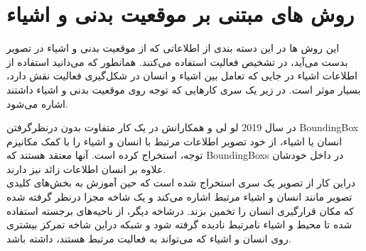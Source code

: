 \section{روش های مبتنی بر موقعیت بدنی و اشیاء}

این روش ها در این دسته بندی از اطلاعاتی که از موقعیت بدنی و اشیاء در تصویر بدست می‌آید، در تشخیص فعالیت استفاده می‌کنند. همانطور که می‌دانید استفاده از اطلاعات اشیاء در جایی که تعامل بین اشیاء و انسان در شکل‌گیری فعالیت نقش دارد، بسیار موثر است. در زیر یک سری کارهایی که توجه روی موقعیت بدنی و اشیاء داشتند اشاره می‌شود.

در سال 2019 لو لی و همکارانش %
\cite{Loss_guided_actv_attention}
در یک کار متفاوت بدون درنظرگرفتن %
\gls{BoundingBox}
 انسان یا اشیاء، از خود تصویر اطلاعات مرتبط با انسان و اشیاء را با کمک مکانیزم توجه، استخراج کرده است. آنها معتقد هستند که %
 \glspl{BoundingBox}
 در داخل خودشان علاوه بر انسان اطلاعات زائد نیز دارند.\\
دراین کار از تصویر یک سری %
استخراج شده است که حین آموزش به بخش‌های کلیدی تصویر مانند انسان و اشیاء مرتبط اشاره می‌کند و یک شاخه مجزا درنظر گرفته شده که مکان قرارگیری انسان را تخمین بزند. درشاخه دیگر، از ناحیه‌های برجسته استفاده شده تا محیط و اشیاء نامرتبط نادیده گرفته شود و شبکه دراین شاخه تمرکز بیشتری روی انسان و اشیاء که می‌تواند به فعالیت مرتبط هستند،‌ داشته باشد.

